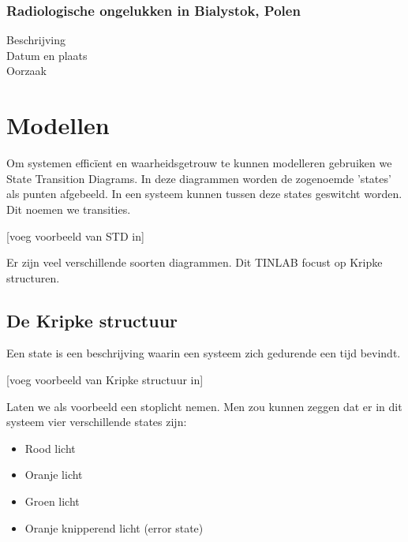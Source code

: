 \documentclass{article}
\begin{document}
			\subsubsection{Radiologische ongelukken in Bialystok, Polen}
			\begin{description}
				\item[Beschrijving] 
				
				\item[Datum en plaats] 
				
				\item[Oorzaak]
				
			\end{description}
			
		
	\newpage
	
	
	\section{Modellen}
	
	Om systemen efficïent en waarheidsgetrouw te kunnen modelleren gebruiken we State Transition Diagrams. In deze diagrammen worden de zogenoemde 'states' als punten afgebeeld. In een systeem kunnen tussen deze states geswitcht worden. Dit noemen we transities.

	[voeg voorbeeld van STD in]

	Er zijn veel verschillende soorten diagrammen. Dit TINLAB focust op Kripke structuren.
	
		\subsection{De Kripke structuur}
		
		Een state is een beschrijving waarin een systeem zich gedurende een tijd bevindt.

		[voeg voorbeeld van Kripke structuur in]

		Laten we als voorbeeld een stoplicht nemen. Men zou kunnen zeggen dat er in dit systeem vier verschillende states zijn:

		\begin{itemize}
			\item Rood licht
			\item Oranje licht
			\item Groen licht
			\item Oranje knipperend licht (error state)
		\end{itemize}
\end{document}
